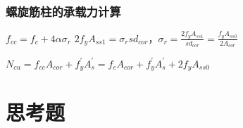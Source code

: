 \documentclass{article}
\begin{document}
\subsubsection{螺旋筋柱的承载力计算}
\par$f_{cc}=f_c+4\alpha\sigma_r$
$2f_yA_{ss1}=\sigma_rsd_{cor}$，$\sigma_r=\frac{2f_yA_{ss1}}{sd_{cor}}=\frac{f_yA_{ss0}}{2A_{cor}}$
\par$N_{cu}=f_{cc}A_{cor}+f_y^{\prime}A_s^{\prime}=f_cA_{cor}+f_y^{\prime}A_s^{\prime}+2f_yA_{ss0}$
\appendix
\newpage
\newcommand{\ans}{\par\noindent答：}
\section{思考题}
\end{document}
